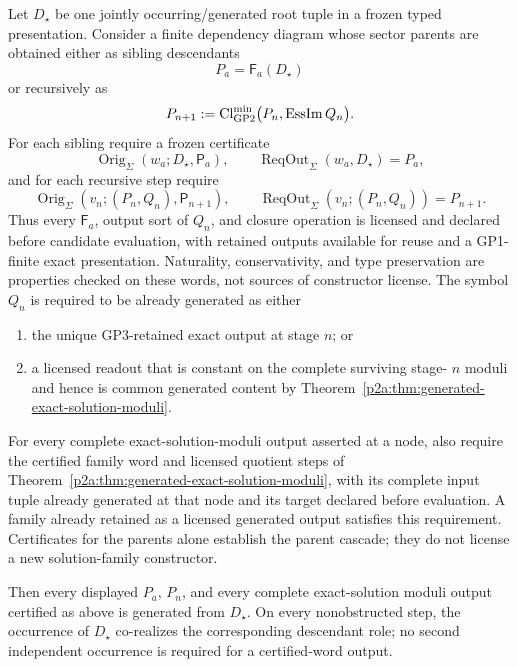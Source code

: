 \documentclass[12pt,a4paper]{article}
\begin{document}
\begin{theorem}
\label{p2a:thm:rooted-generated-parent-cascade}
Let \(D_\star\) be one jointly occurring/generated root tuple in a frozen
typed presentation.  Consider a finite dependency diagram whose sector
parents are obtained either as sibling descendants
\[
 P_a=\mathsf F_a(D_\star)
\]
or recursively as
\begin{equation}
\label{p2a:eq:rooted-generated-parent-cascade}
 P_{n+1}
 :=\operatorname{Cl}^{\min}_{\rm GP2}
 \bigl(P_n,\operatorname{EssIm}Q_n\bigr).
\end{equation}
For each sibling require a frozen certificate
\[
 \operatorname{Orig}_{\Sigma}(w_a;D_\star,\mathsf P_a),
 \qquad \operatorname{ReqOut}_{\Sigma}(w_a,D_\star)=P_a,
\]
and for each recursive step require
\[
 \operatorname{Orig}_{\Sigma}
   (v_n;(P_n,Q_n),\mathsf P_{n+1}),
 \qquad
 \operatorname{ReqOut}_{\Sigma}(v_n;(P_n,Q_n))=P_{n+1}.
\]
Thus every \(\mathsf F_a\), output sort of \(Q_n\), and closure operation is
licensed and declared before candidate evaluation, with retained outputs
available for reuse and a GP1-finite exact presentation.  Naturality,
conservativity, and type preservation are properties checked on these words,
not sources of constructor license.  The symbol \(Q_n\) is required to be
already generated as either

\begin{enumerate}[label=(\alph*),leftmargin=2em]
\item the unique GP3-retained exact output at stage \(n\); or
\item a licensed readout that is constant on the complete surviving stage-
      \(n\) moduli and hence is common generated content by
      Theorem~\ref{p2a:thm:generated-exact-solution-moduli}.
\end{enumerate}


For every complete exact-solution-moduli output asserted at a node,
also require the certified family word and licensed quotient steps of
Theorem~\ref{p2a:thm:generated-exact-solution-moduli}, with its complete
input tuple already generated at that node and its target declared before
evaluation. A family already retained as a licensed generated output
satisfies this requirement. Certificates for the parents alone establish
the parent cascade; they do not license a new solution-family constructor.

Then every displayed \(P_a\), \(P_n\), and every complete exact-solution
moduli output certified as above is generated from \(D_\star\).  On every nonobstructed step, the occurrence of
\(D_\star\) co-realizes the corresponding descendant role; no second
independent occurrence is required for a certified-word output.


\end{theorem}
\end{document}
